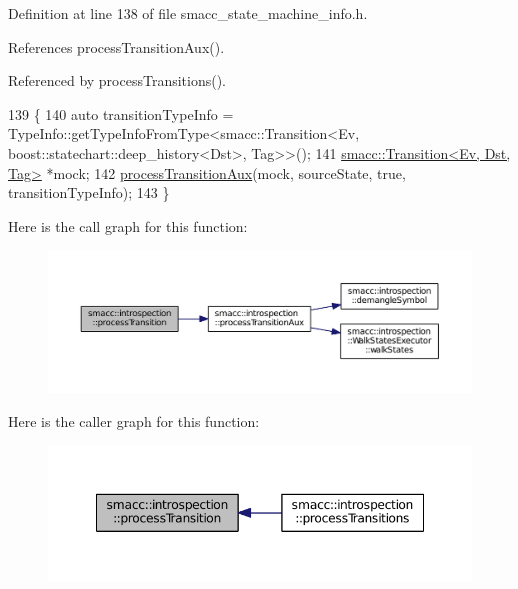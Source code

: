 Definition at line 138 of file smacc\+\_\+state\+\_\+machine\+\_\+info.\+h.



References process\+Transition\+Aux().



Referenced by process\+Transitions().


\begin{DoxyCode}
139 \{
140     \textcolor{keyword}{auto} transitionTypeInfo = TypeInfo::getTypeInfoFromType<smacc::Transition<Ev,
       boost::statechart::deep\_history<Dst>, Tag>>();
141     \hyperlink{classsmacc_1_1Transition}{smacc::Transition<Ev, Dst, Tag>} *mock;
142     \hyperlink{namespacesmacc_1_1introspection_a208cd71dc5579090d40b3d3b9efb28a6}{processTransitionAux}(mock, sourceState, \textcolor{keyword}{true}, transitionTypeInfo);
143 \}
\end{DoxyCode}


Here is the call graph for this function\+:
\nopagebreak
\begin{figure}[H]
\begin{center}
\leavevmode
\includegraphics[width=350pt]{namespacesmacc_1_1introspection_a91f7cda900e7002c923494db5afce63f_cgraph}
\end{center}
\end{figure}




Here is the caller graph for this function\+:
\nopagebreak
\begin{figure}[H]
\begin{center}
\leavevmode
\includegraphics[width=348pt]{namespacesmacc_1_1introspection_a91f7cda900e7002c923494db5afce63f_icgraph}
\end{center}
\end{figure}


